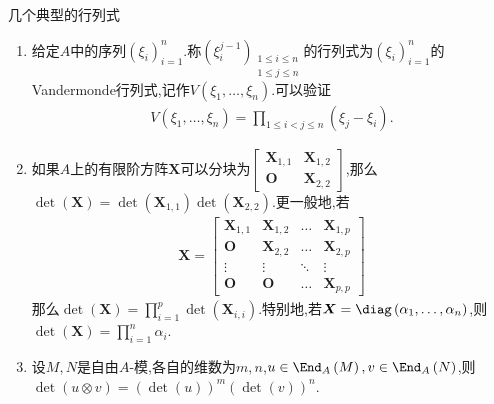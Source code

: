 \begin{example}{几个典型的行列式}{}
	\begin{enumerate}
		\item 给定$A$中的序列$\left(\xi_{i}\right)_{i=1}^{n}$.称$\left(\xi_{i}^{j-1}\right)_{\substack{1\leq i\leq n\\1\leq j\leq n}}$的行列式为$\left(\xi_{i}\right)_{i=1}^{n}$的Vandermonde行列式,记作$V\left(\xi_{1},\ldots,\xi_{n}\right)$.可以验证
		\begin{align*}
			V\left(\xi_{1},\ldots,\xi_{n}\right)=\prod\limits_{1\leq i<j\leq n}\left(\xi_{j}-\xi_{i}\right).
		\end{align*}
		\item 如果$A$上的有限阶方阵$\boldsymbol{X}$可以分块为$
		\begin{bmatrix}
			\boldsymbol{X}_{1,1}&\boldsymbol{X}_{1,2}\\
			\boldsymbol{O}&\boldsymbol{X}_{2,2}
		\end{bmatrix}$,那么$\det\left(\boldsymbol{X}\right)=\det\left(\boldsymbol{X}_{1,1}\right)\det\left(\boldsymbol{X}_{2,2}\right)$.更一般地,若
		\begin{align*}
			\boldsymbol{X}=\begin{bmatrix}
				\boldsymbol{X}_{1,1}&\boldsymbol{X}_{1,2}&\ldots&\boldsymbol{X}_{1,p}\\
				\boldsymbol{O}&\boldsymbol{X}_{2,2}&\ldots&\boldsymbol{X}_{2,p}\\
				\vdots&\vdots&\ddots&\vdots\\
				\boldsymbol{O}&\boldsymbol{O}&\ldots&\boldsymbol{X}_{p,p}
			\end{bmatrix}
		\end{align*}
		那么$\det\left(\boldsymbol{X}\right)=\prod\limits_{i=1}^{p}\det\left(\boldsymbol{X}_{i,i}\right)$.特别地,若$\boldsymbol{X}=\diag\left(\alpha_{1},\ldots,\alpha_{n}\right)$,则$\det\left(\boldsymbol{X}\right)=\prod\limits_{i=1}^{n}\alpha_{i}$.
		\item 设$M,N$是自由$A$-模,各自的维数为$m,n$,$u\in\End_{A}\left(M\right),v\in\End_{A}\left(N\right)$,则$\det\left(u\otimes v\right)=\left(\det\left(u\right)\right)^{m}\left(\det\left(v\right)\right)^{n}$.
	\end{enumerate}
\end{example}








